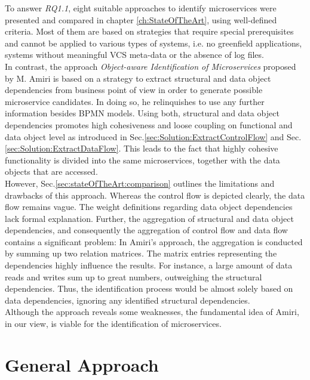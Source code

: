 To answer \textit{RQ1.1}, eight suitable approaches to identify microservices were presented and compared in chapter \ref{ch:StateOfTheArt}, using well-defined criteria. Most of them are based on strategies that require special prerequisites and cannot be applied to various types of systems, i.e. no greenfield applications, systems without meaningful VCS meta-data or the absence of log files. \\
In contrast, the approach \textit{Object-aware Identification of Microservices} proposed by M. Amiri \cite{ObjectAwareAmiri} is based on a strategy to extract structural and data object dependencies from business point of view in order to generate possible microservice candidates. In doing so, he relinquishes to use any further information besides BPMN models. Using both, structural and data object dependencies promotes high cohesiveness and loose coupling on functional and data object level as introduced in Sec.\ref{sec:Solution:ExtractControlFlow} and Sec.\ref{sec:Solution:ExtractDataFlow}. This leads to the fact that highly cohesive functionality is divided into the same microservices, together with the data objects that are accessed.  \\
However, Sec.\ref{sec:stateOfTheArt:comparison} outlines the limitations and drawbacks of this approach. Whereas the control flow is depicted clearly, the data flow remains vague. The weight definitions regarding data object dependencies lack formal explanation. Further, the aggregation of structural and data object dependencies, and consequently the aggregation of control flow and data flow contains a significant problem: In Amiri's approach, the aggregation is conducted by summing up two relation matrices. The matrix entries representing the dependencies highly influence the results. For instance, a large amount of data reads and writes sum up to great numbers, outweighing the structural dependencies. Thus, the identification process would be almost solely based on data dependencies, ignoring any identified structural dependencies. \\
Although the approach reveals some weaknesses, the fundamental idea of Amiri, in our view, \cite{ObjectAwareAmiri} is viable for the identification of microservices.








\section{General Approach}



